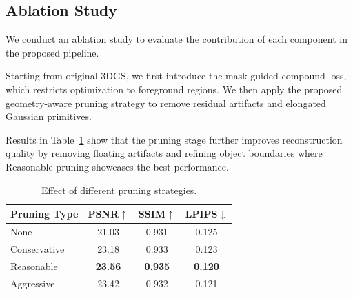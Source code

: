 \subsection{Ablation Study}

We conduct an ablation study to evaluate the contribution of each component in the proposed pipeline.

Starting from original 3DGS, we first introduce the mask-guided compound loss, which restricts optimization to foreground regions. We then apply the proposed geometry-aware pruning strategy to remove residual artifacts and elongated Gaussian primitives.

Results in Table~\ref{tab:ablation} show that the pruning stage further improves reconstruction quality by removing floating artifacts and refining object boundaries where Reasonable pruning showcases the best performance.

\begin{table}[t]
\centering
\caption{Effect of different pruning strategies.}
\label{tab:ablation}
\begin{tabular}{lccc}
\toprule
Pruning Type & PSNR$\uparrow$ & SSIM$\uparrow$ & LPIPS$\downarrow$\\
\midrule
None & 21.03 & 0.931 & 0.125\\
Conservative & 23.18 & 0.933 & 0.123\\
Reasonable & \textbf{23.56} & \textbf{0.935} & \textbf{0.120}\\
Aggressive & 23.42 & 0.932 & 0.121\\
\bottomrule
\end{tabular}
\end{table}

